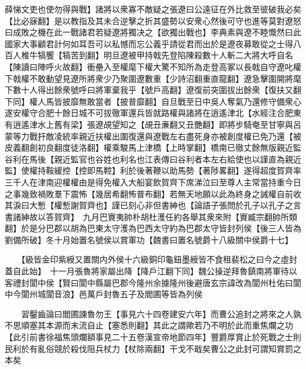 薛悌文吏也使勿得與戰】諸將以衆寡不敵疑之張遼曰公遠征在外比救至彼破我必矣【比必寐翻】是以教指及其未合逆擊之折其盛勢以安衆心然後可守也進等莫對遼怒曰成敗之機在此一戰諸君若疑遼將獨决之【欲獨出戰也】李典素與遼不睦慨然曰此國家大事顧君計何如耳吾可以私憾而忘公義乎請從君而出於是遼夜募敢從之士得八百人椎牛犒饗【犒苦到翻】明旦遼被甲持戟先登陷陳殺數十人斬二大將大呼自名【陳讀曰陣呼火故翻】衝壘入至權麾下權大驚不知所為走登高冢以長戟自守遼叱權下戟權不敢動望見遼所將衆少乃聚圍遼數重【少詩沼翻重直龍翻】遼急擊圍開將麾下數十人得出餘衆號呼曰將軍棄我乎【號戶高翻】遼復前突圍拔出餘衆【復扶又翻下同】權人馬皆披靡無敢當者【披普靡翻】自旦戰至日中吳人奪氣乃還修守備衆心遂安權守合肥十餘日城不可拔徹軍還兵皆就路權與諸將在逍遙津北【水經注合肥東有逍遙津水上舊有梁】張遼覘望知之【覘丑亷翻又丑艷翻】即將步騎奄至甘寧與呂蒙等力戰扞敵凌統率親近扶權出圍復還與遼戰左右盡死身亦被創度權已免乃還【被皮義翻創初良翻度徒洛翻】權乘駿馬上津橋【上時掌翻】橋南已徹丈餘無版親近監谷利在馬後【親近監官也谷姓也利名也江表傳曰谷利者本左右給使也以謹直為親近監】使權持鞍緩控【控即馬鞚】利於後著鞭以助馬勢【著陟畧翻】遂得超度賀齊率三千人在津南迎權權由是得免權入大船宴飲賀齊下席涕泣曰至尊人主常當持重今日之事幾致禍敗羣下震怖【幾居希翻怖普布翻】若無天地願以此為終身之誡權自前收其淚曰大慙【權慙謝賀齊也】謹已刻心非但書紳也【論語子張問於孔子以孔子之言書諸紳故以答賀齊】　九月巴賨夷帥朴胡杜濩任約各舉其衆來附【賨臧宗翻帥所類翻】於是分巴郡以胡為巴東太守濩為巴西太守約為巴郡太守皆封列侯【後三人皆為劉備所破】冬十月始置名號侯以賞軍功【魏書曰置名號爵十八級關中侯爵十七】

　　【級皆金印紫綬又置關内外侯十六級銅印龜鈕墨綬皆不食租裴松之曰今之虛封蓋自此始】　十一月張魯將家屬出降【降戶江翻下同】魏公操逆拜魯鎮南將軍待以客禮封閬中侯【賢曰閬中縣屬巴郡今隆州余據隆州後避唐玄宗諱改為閬州杜佑曰閬中今閬州城閬音浪】邑萬戶封魯五子及閻圃等皆為列侯

　　習鑿齒論曰閻圃諫魯勿王【事見六十四卷建安六年】而曹公追封之將來之人孰不思順塞其本源而末流自止【塞悉則翻】其此之謂歟若乃不明於此而重焦爛之功【此引前書徐福焦頭爛額事見二十五卷漢宣帝地節四年】豐爵厚賞止於死戰之士則民利於有亂俗競於殺伐阻兵杖力【杖除兩翻】干戈不戢矣曹公之此封可謂知賞罰之本矣

